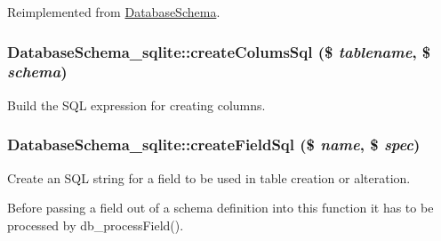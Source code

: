 Reimplemented from \hyperlink{classDatabaseSchema_ab2470d34145fdbb413dd952baf7067be}{DatabaseSchema}.\hypertarget{classDatabaseSchema__sqlite_a134fb7e8fbeb0ff0f7c8bfa6d73f3da0}{
\subsubsection[{createColumsSql}]{\setlength{\rightskip}{0pt plus 5cm}DatabaseSchema\_\-sqlite::createColumsSql (\$ {\em tablename}, \/  \$ {\em schema})}}
\label{classDatabaseSchema__sqlite_a134fb7e8fbeb0ff0f7c8bfa6d73f3da0}
Build the SQL expression for creating columns. \hypertarget{classDatabaseSchema__sqlite_a2282f26222ac5d7e08e9ca7d481040fc}{
\subsubsection[{createFieldSql}]{\setlength{\rightskip}{0pt plus 5cm}DatabaseSchema\_\-sqlite::createFieldSql (\$ {\em name}, \/  \$ {\em spec})}}
\label{classDatabaseSchema__sqlite_a2282f26222ac5d7e08e9ca7d481040fc}
Create an SQL string for a field to be used in table creation or alteration.

Before passing a field out of a schema definition into this function it has to be processed by db\_\-processField().


